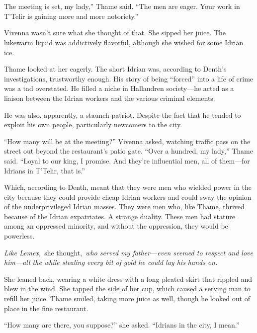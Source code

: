 \chapter{}

The meeting is set, my lady,” Thame said. “The men are eager. Your work in T’Telir is gaining more and more notoriety.”

Vivenna wasn’t sure what she thought of that. She sipped her juice. The lukewarm liquid was addictively flavorful, although she wished for some Idrian ice.

Thame looked at her eagerly. The short Idrian was, according to Denth’s investigations, trustworthy enough. His story of being “forced” into a life of crime was a tad overstated. He filled a niche in Hallandren society—he acted as a liaison between the Idrian workers and the various criminal elements.

He was also, apparently, a staunch patriot. Despite the fact that he tended to exploit his own people, particularly newcomers to the city.

“How many will be at the meeting?” Vivenna asked, watching traffic pass on the street out beyond the restaurant’s patio gate. “Over a hundred, my lady,” Thame said. “Loyal to our king, I promise. And they’re influential men, all of them—for Idrians in T’Telir, that is.”

Which, according to Denth, meant that they were men who wielded power in the city because they could provide cheap Idrian workers and could sway the opinion of the underprivileged Idrian masses. They were men who, like Thame, thrived because of the Idrian expatriates. A strange duality. These men had stature among an oppressed minority, and without the oppression, they would be powerless.

\textit{Like Lemex,}~she thought,~\textit{who served my father—even seemed to respect and love him—all the while stealing every bit of gold he could lay his hands on.}

She leaned back, wearing a white dress with a long pleated skirt that rippled and blew in the wind. She tapped the side of her cup, which caused a serving man to refill her juice. Thame smiled, taking more juice as well, though he looked out of place in the fine restaurant.

“How many are there, you suppose?” she asked. “Idrians in the city, I mean.”

